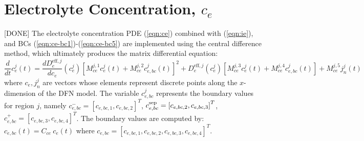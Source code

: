\documentclass[12pt]{article}
\newcommand{\eff}{\text{eff}}
\providecommand{\sep}{\ensuremath{\rm{sep}}}
\newcommand{\green}[1]{{\color{green}#1}}
\begin{document}
\section{Electrolyte Concentration, $c_{e}$}\label{sec:ce}
\green{[DONE]} The electrolyte concentration PDE (\ref{eqn:ce}) combined with (\ref{eqn:ie}), and BCs (\ref{eqn:ce-bc1})-(\ref{eqn:ce-bc5}) are implemented using the central difference method, which ultimately produces the matrix differential equation:
\begin{equation}
	\frac{d}{dt} c_{e}^j(t) = \frac{d D_e^{\eff,j}}{d c_e}(c_e^j) \left[ M^{j,1}_{ce} c_{e}^j(t) + M^{j,2}_{ce} c_{e,bc}^j(t) \right]^2 + D_e^{\eff,j}(c_e^j) \left[ M^{j,3}_{ce} c_{e}^j(t) + M^{j,4}_{ce} c_{e,bc}^j(t) \right] + M^{j,5}_{ce} j_{n}^j(t)
\end{equation}
where $c_{e}, j_{n}^j$ are vectors whose elements represent discrete points along the $x$-dimension of the DFN model. The variable $c_{e,bc}^j$ represents the boundary values for region $j$, namely $c_{e,bc}^- = \left[c_{e,bc,1}, c_{e,bc,2} \right]^T$, $c_{e,bc}^{\sep} = \left[c_{e,bc,2}, c_{e,bc,3} \right]^T$, $c_{e,bc}^{+} = \left[c_{e,bc,3}, c_{e,bc,4} \right]^T$. The boundary values are computed by: $c_{e,bc}(t) = C_{ce} \ c_{e}(t)$ where $c_{e,bc} = \left[c_{e,bc,1}, c_{e,bc,2}, c_{e,bc,3}, c_{e,bc,4} \right]^T$.
\end{document}
